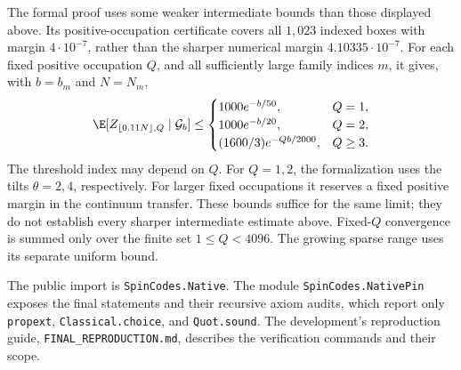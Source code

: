 The formal proof uses some weaker intermediate bounds than those displayed
above. Its positive-occupation certificate covers all $1{,}023$ indexed boxes
with margin $4\cdot10^{-7}$, rather than the sharper numerical margin
$4.10335\cdot10^{-7}$. For each fixed positive occupation $Q$, and all
sufficiently large family indices $m$, it gives, with $b=b_m$ and $N=N_m$,
\[
 \E[Z_{\lfloor0.11N\rfloor,Q}\mid\mathcal G_b]
 \le
 \begin{cases}
  1000e^{-b/50}, & Q=1,\\
  1000e^{-b/20}, & Q=2,\\
  (1600/3)e^{-Qb/2000}, & Q\ge3.
 \end{cases}
\]
The threshold index may depend on $Q$. For $Q=1,2$, the formalization uses
the tilts $\theta=2,4$, respectively. For larger fixed occupations it
reserves a fixed positive margin in the continuum transfer. These bounds
suffice for the same limit; they do not establish every sharper intermediate
estimate above. Fixed-$Q$ convergence is summed only over the finite set
$1\le Q<4096$. The growing sparse range uses its separate uniform bound.

The public import is \texttt{SpinCodes.Native}.
The module \texttt{SpinCodes.NativePin} exposes the final statements and
their recursive axiom audits, which report only \texttt{propext},
\texttt{Classical.choice}, and \texttt{Quot.sound}. The development's
reproduction guide, \texttt{FINAL\_REPRODUCTION.md}, describes the
verification commands and their scope.
